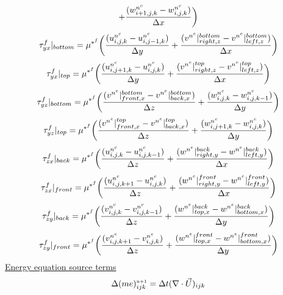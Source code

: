 \documentclass[fleqn]{article}
\begin{document}
{\begin{equation*}
+   \frac{ (\wvelnc_{i+1,j,k} - \wvelnc_{i,j,k}) }{ \delx } \biggl )
\end{equation*}
%
%
\begin{equation*}
    \tau^{f}_{yx}|_{bottom} = 
    \mu^{*^{f}} \biggr(\frac{ (\uvelnc_{i,j,k} - \uvelnc_{i,j-1,k}) }{ \dely } 
+   \frac{ (v^{n^{e}}|^{bottom}_{right,z} - v^{n^{e}}|^{bottom}_{left,z}) }{ \delx } \biggl)
\end{equation*}
%
%
\begin{equation*}
    \tau^{f}_{yx}|_{top} = 
    \mu^{*^{f}} \biggr(\frac{ (\uvelnc_{i,j+1,k} - \uvelnc_{i,j,k}) }{ \dely } 
+   \frac{ (v^{n^{e}}|^{top}_{right,z} - v^{n^{e}}|^{top}_{left,z}) }{ \delx } \biggl)
\end{equation*}
%
\begin{equation*}
    \tau^{f}_{yz}|_{bottom} = 
    \mu^{*^{f}} \biggr(\frac{ (v^{n^{e}}|^{bottom}_{front,x}   - v^{n^{e}}|^{bottom}_{back,x}) }{ \delz } 
+   \frac{ (\wvelnc_{i,j,k} - \wvelnc_{i,j,k-1}) }{ \dely } \biggl)
\end{equation*}
%
\begin{equation*}
    \tau^{f}_{yz}|_{top} = 
    \mu^{*^{f}} \biggr(\frac{ (v^{n^{e}}|^{top}_{front,x}   - v^{n^{e}}|^{top}_{back,x}) }{ \delz } 
+   \frac{ (\wvelnc_{i,j+1,k} - \wvelnc_{i,j,k}) }{ \dely } \biggl)
\end{equation*}
%
\begin{equation*}
    \tau^{f}_{zx}|_{back} =
    \mu^{*^{f}} \biggr(\frac{ (\uvelnc_{i,j,k} - \uvelnc_{i,j,k-1}) }{ \delz } 
+   \frac{  (w^{n^{e}}|^{back}_{right,y} - w^{n^{e}}|^{back}_{left,y})  }{ \delx }\biggl )
\end{equation*}
%
\begin{equation*}
    \tau^{f}_{zx}|_{front} =
    \mu^{*^{f}} \biggr( \frac{ (\uvelnc_{i,j,k+1} - \uvelnc_{i,j,k}) }{ \delz }
+   \frac{ (w^{n^{e}}|^{front}_{right,y} - w^{n^{e}}|^{front}_{left,y}) }{ \delx } \biggl )
\end{equation*}
%
%
\begin{equation*}
    \tau^{f}_{zy}|_{back} = 
    \mu^{*^{f}} \biggr(\frac{ (\vvelnc_{i,j,k} - \vvelnc_{i,j,k-1}) }{ \delz } 
+   \frac{ (w^{n^{e}}|^{back}_{top,x} - w^{n^{e}}|^{back}_{bottom,x}) }{ \dely } \biggl)
\end{equation*}
%
\begin{equation*}
    \tau^{f}_{zy}|_{front} = 
    \mu^{*^{f}} \biggr(\frac{ (\vvelnc_{i,j,k+1} - \vvelnc_{i,j,k}) }{ \delz } 
+   \frac{ (w^{n^{e}}|^{front}_{top,x} - w^{n^{e}}|^{front}_{bottom,x}) }{ \dely } \biggl)
\end{equation*}
%
%
\underline{\textsf{Energy equation source terms}}\\
\begin{equation}
    \Delta( m e)^{\nadv}_{ijk}  = \delt (\nabla \cdot \vec{U})_{ijk}
\end{equation}
%
%
%
%
}
\end{document}
